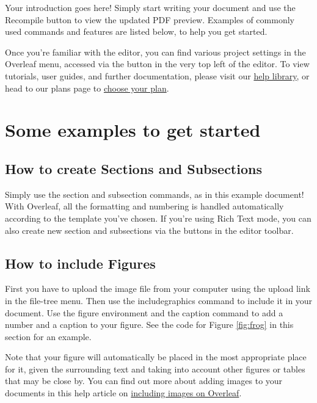 \documentclass{article}
\begin{document}
    Your introduction goes here! Simply start writing your document and use the Recompile button to view the updated PDF preview. Examples of commonly used commands and features are listed below, to help you get started.

    Once you're familiar with the editor, you can find various project settings in the Overleaf menu, accessed via the button in the very top left of the editor. To view tutorials, user guides, and further documentation, please visit our \href{https://www.overleaf.com/learn}{help library}, or head to our plans page to \href{https://www.overleaf.com/user/subscription/plans}{choose your plan}.


    \section{Some examples to get started}

    \subsection{How to create Sections and Subsections}

    Simply use the section and subsection commands, as in this example document! With Overleaf, all the formatting and numbering is handled automatically according to the template you've chosen. If you're using Rich Text mode, you can also create new section and subsections via the buttons in the editor toolbar.

    \subsection{How to include Figures}

    First you have to upload the image file from your computer using the upload link in the file-tree menu. Then use the includegraphics command to include it in your document. Use the figure environment and the caption command to add a number and a caption to your figure. See the code for Figure \ref{fig:frog} in this section for an example.

    Note that your figure will automatically be placed in the most appropriate place for it, given the surrounding text and taking into account other figures or tables that may be close by. You can find out more about adding images to your documents in this help article on \href{https://www.overleaf.com/learn/how-to/Including_images_on_Overleaf}{including images on Overleaf}.
\end{document}

